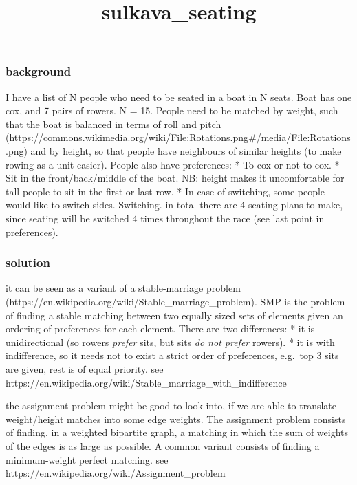 \documentclass[11pt]{article}
\title{sulkava\_seating}
\begin{document}
    
    
    \maketitle
    
    

    
    \hypertarget{background}{%
\subsubsection{background}\label{background}}

I have a list of N people who need to be seated in a boat in N seats.
Boat has one cox, and 7 pairs of rowers. N = 15. People need to be
matched by weight, such that the boat is balanced in terms of roll and
pitch
(https://commons.wikimedia.org/wiki/File:Rotations.png\#/media/File:Rotations.png)
and by height, so that people have neighbours of similar heights (to
make rowing as a unit easier). People also have preferences: * To cox or
not to cox. * Sit in the front/back/middle of the boat. NB: height makes
it uncomfortable for tall people to sit in the first or last row. * In
case of switching, some people would like to switch sides. Switching. in
total there are 4 seating plans to make, since seating will be switched
4 times throughout the race (see last point in preferences).

\hypertarget{solution}{%
\subsubsection{solution}\label{solution}}

it can be seen as a variant of a stable-marriage problem
(https://en.wikipedia.org/wiki/Stable\_marriage\_problem). SMP is the
problem of finding a stable matching between two equally sized sets of
elements given an ordering of preferences for each element. There are
two differences: * it is unidirectional (so rowers \emph{prefer} sits,
but sits \emph{do not prefer} rowers). * it is with indifference, so it
needs not to exist a strict order of preferences, e.g.~top 3 sits are
given, rest is of equal priority. see
https://en.wikipedia.org/wiki/Stable\_marriage\_with\_indifference

the assignment problem might be good to look into, if we are able to
translate weight/height matches into some edge weights. The assignment
problem consists of finding, in a weighted bipartite graph, a matching
in which the sum of weights of the edges is as large as possible. A
common variant consists of finding a minimum-weight perfect matching.
see https://en.wikipedia.org/wiki/Assignment\_problem
\end{document}
